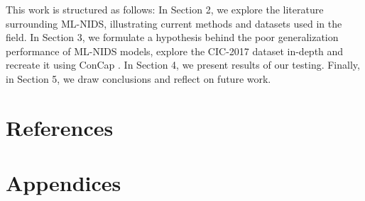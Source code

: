 \documentclass[english]{article}
\begin{document}
	This work is structured as follows: In Section 2, we explore the literature surrounding ML-NIDS, illustrating current methods and datasets used in the field. In Section 3, we formulate a hypothesis behind the poor generalization performance of ML-NIDS models, explore the CIC-2017 dataset in-depth and recreate it using ConCap \cite{concap}. In Section 4, we present results of our testing. Finally, in Section 5, we draw conclusions and reflect on future work.
	
	\newpage
	
	
	\newpage
	
	
	\newpage
	
	
	\newpage
	
	
	
	
	
	
	\newpage
	\section{References}
	\printbibliography[heading=none]
	\newpage
	\section{Appendices}
	
	
\end{document}
